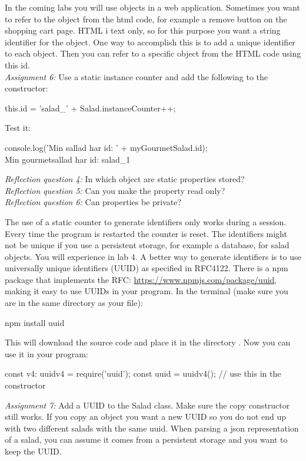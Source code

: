 \documentclass[fleqn, article, a4paper]{memoir}
\begin{document}
\begin{Assignments}
\item In the coming labs you will use  objects in a web application. Sometimes you want to refer to the object from the html code, for example a remove button on the shopping cart page. HTML i text only, so for this purpose you want a string identifier for the object. One way to accomplish this is to add a unique identifier to each  object. Then you can refer to a specific object from the HTML code using this id.
\\\emph{Assignment 6:}
Use a static instance counter and add the following to the  constructor:
\begin{Code}
    this.id = 'salad_' + Salad.instanceCounter++;
\end{Code}
Test it:
\begin{Code}
console.log('Min sallad har id: ' + myGourmetSalad.id);
\\ Min gourmetsallad har id: salad_1
\end{Code}
\emph{Reflection question 4:} In which object are static properties stored?
\\\emph{Reflection question 5:} Can you make the  property read only?
\\\emph{Reflection question 6:} Can properties be private?

\item
The use of a static counter to generate identifiers only works during a session. Every time the program is restarted the counter is reset. The identifiers might not be unique if you use a persistent storage, for example a database, for salad objects. You will experience in lab 4. A better way to generate identifiers is to use universally unique identifiers (UUID) as specified in RFC4122. There is a npm package that implements the RFC: \url{https://www.npmjs.com/package/uuid}, making it easy to use UUIDs in your program. In the terminal (make sure you are in the same directory as your  file):
\begin{Code}
   npm install uuid
\end{Code}
This will download the source code and place it in the directory . Now you can use it in your program:
\begin{Code}
  const { v4: uuidv4 } = require('uuid');
  const uuid = uuidv4();  // use this in the constructor
\end{Code}
\emph{Assignment 7:} Add a UUID to the Salad class. Make sure the copy constructor still works. If you copy an object you want a new UUID so you do not end up with two different salads with the same uuid. When parsing a json representation of a salad, you can assume it comes from a persistent storage and you want to keep the UUID.

\end{Assignments}
\end{document}
